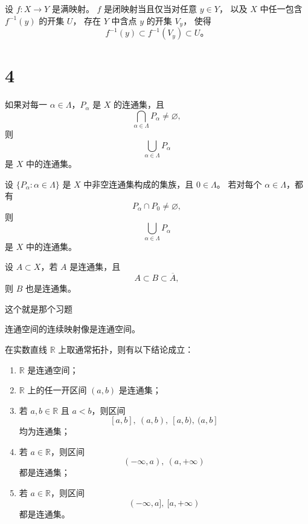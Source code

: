 \begin{theorem}
设 $f:X\to Y$ 是满映射。
$f$ 是闭映射当且仅当对任意 $y\in Y$，
以及 $X$ 中任一包含 $f^{-1}(y)$ 的开集 $U$，
存在 $Y$ 中含点 $y$ 的开集 $V_y$，
使得
\[
f^{-1}(y)\subset f^{-1}(V_y)\subset U。
\]
\end{theorem}
\section{4}
\begin{theorem}
如果对每一 $\alpha\in\Lambda$，$P_\alpha$ 是 $X$ 的连通集，且
\[
\bigcap_{\alpha\in\Lambda} P_\alpha \neq \varnothing,
\]
则
\[
\bigcup_{\alpha\in\Lambda} P_\alpha
\]
是 $X$ 中的连通集。
\end{theorem}

\begin{theorem}[定理 4.3（所有与某个公共连通集相交的一族连通集的并仍然是连通的）]
设 $\{P_\alpha:\alpha\in\Lambda\}$ 是 $X$ 中非空连通集构成的集族，且 $0\in\Lambda$。
若对每个 $\alpha\in\Lambda$，都有
\[
P_\alpha\cap P_0\neq\varnothing,
\]
则
\[
\bigcup_{\alpha\in\Lambda} P_\alpha
\]
是 $X$ 中的连通集。
\end{theorem}

\begin{theorem}[定理 4.4（连通集和它的闭包之间的集合都是连通的）]
设 $A\subset X$，若 $A$ 是连通集，且
\[
A\subset B\subset \overline{A},
\]
则 $B$ 也是连通集。
\end{theorem}
\begin{dxtips}
 这个就是那个习题   
\end{dxtips}

\begin{theorem}[定理 4.5（连通空间 + 连续映射 $=$ 连通）]
连通空间的连续映射像是连通空间。
\end{theorem}

\begin{proposition}[命题 4.1（通常拓扑的结论）]
在实数直线 $\mathbb{R}$ 上取通常拓扑，则有以下结论成立：
\begin{enumerate}
  \item $\mathbb{R}$ 是连通空间；
  \item $\mathbb{R}$ 上的任一开区间 $(a,b)$ 是连通集；
  \item 若 $a,b\in\mathbb{R}$ 且 $a<b$，则区间
  \[
  [a,b],\ (a,b),\ [a,b),\ (a,b]
  \]
  均为连通集；
  \item 若 $a\in\mathbb{R}$，则区间
  \[
  (-\infty,a),\ (a,+\infty)
  \]
  都是连通集；
  \item 若 $a\in\mathbb{R}$，则区间
  \[
  (-\infty,a],\ [a,+\infty)
  \]
  都是连通集。
\end{enumerate}
\end{proposition}

